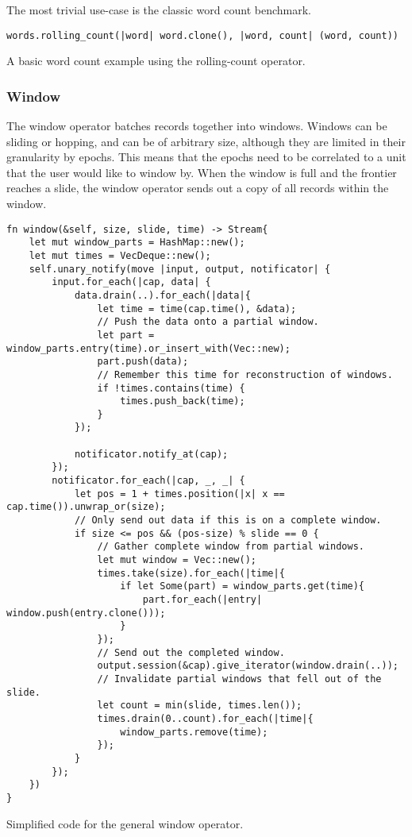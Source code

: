 The most trivial use-case is the classic word count benchmark.

\begin{listing}[H]
\begin{verbatim}
words.rolling_count(|word| word.clone(), |word, count| (word, count))
\end{verbatim}
\caption{A basic word count example using the rolling-count operator.}
\label{lst:rolling-count-example}
\end{listing}

\subsubsection{Window}
The window operator batches records together into windows. Windows can be sliding or hopping, and can be of arbitrary size, although they are limited in their granularity by epochs. This means that the epochs need to be correlated to a unit that the user would like to window by. When the window is full and the frontier reaches a slide, the window operator sends out a copy of all records within the window.

\begin{listing}[H]
\begin{verbatim}
fn window(&self, size, slide, time) -> Stream{
    let mut window_parts = HashMap::new();
    let mut times = VecDeque::new();
    self.unary_notify(move |input, output, notificator| {
        input.for_each(|cap, data| {
            data.drain(..).for_each(|data|{
                let time = time(cap.time(), &data);
                // Push the data onto a partial window.
                let part = window_parts.entry(time).or_insert_with(Vec::new);
                part.push(data);
                // Remember this time for reconstruction of windows.
                if !times.contains(time) {
                    times.push_back(time);
                }
            });
            
            notificator.notify_at(cap);
        });
        notificator.for_each(|cap, _, _| {
            let pos = 1 + times.position(|x| x == cap.time()).unwrap_or(size);
            // Only send out data if this is on a complete window.
            if size <= pos && (pos-size) % slide == 0 {
                // Gather complete window from partial windows.
                let mut window = Vec::new();
                times.take(size).for_each(|time|{
                    if let Some(part) = window_parts.get(time){
                        part.for_each(|entry| window.push(entry.clone()));
                    }
                });
                // Send out the completed window.
                output.session(&cap).give_iterator(window.drain(..));
                // Invalidate partial windows that fell out of the slide.
                let count = min(slide, times.len());
                times.drain(0..count).for_each(|time|{
                    window_parts.remove(time);
                });
            }
        });
    })
}
\end{verbatim}
  \caption{Simplified code for the general window operator.}
  \label{lst:epoch-window}
\end{listing}

